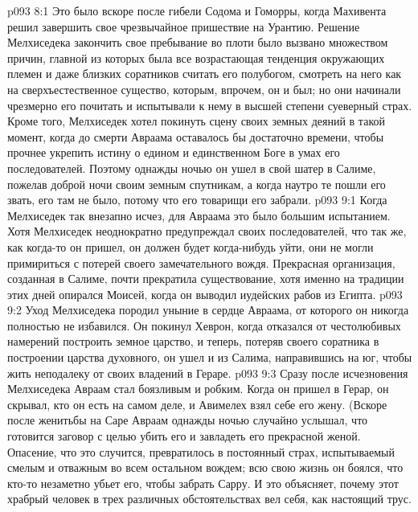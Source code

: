 \vs p093 8:1 Это было вскоре после гибели Содома и Гоморры, когда Махивента решил завершить свое чрезвычайное пришествие на Урантию. Решение Мелхиседека закончить свое пребывание во плоти было вызвано множеством причин, главной из которых была все возрастающая тенденция окружающих племен и даже близких соратников считать его полубогом, смотреть на него как на сверхъестественное существо, которым, впрочем, он и был; но они начинали чрезмерно его почитать и испытывали к нему в высшей степени суеверный страх. Кроме того, Мелхиседек хотел покинуть сцену своих земных деяний в такой момент, когда до смерти Авраама оставалось бы достаточно времени, чтобы прочнее укрепить истину о едином и единственном Боге в умах его последователей. Поэтому однажды ночью он ушел в свой шатер в Салиме, пожелав доброй ночи своим земным спутникам, а когда наутро те пошли его звать, его там не было, потому что его товарищи его забрали.
\vs p093 9:1 Когда Мелхиседек так внезапно исчез, для Авраама это было большим испытанием. Хотя Мелхиседек неоднократно предупреждал своих последователей, что так же, как когда\hyp{}то он пришел, он должен будет когда\hyp{}нибудь уйти, они не могли примириться с потерей своего замечательного вождя. Прекрасная организация, созданная в Салиме, почти прекратила существование, хотя именно на традиции этих дней опирался Моисей, когда он выводил иудейских рабов из Египта.
\vs p093 9:2 \pc Уход Мелхиседека породил уныние в сердце Авраама, от которого он никогда полностью не избавился. Он покинул Хеврон, когда отказался от честолюбивых намерений построить земное царство, и теперь, потеряв своего соратника в построении царства духовного, он ушел и из Салима, направившись на юг, чтобы жить неподалеку от своих владений в Гераре.
\vs p093 9:3 Сразу после исчезновения Мелхиседека Авраам стал боязливым и робким. Когда он пришел в Герар, он скрывал, кто он есть на самом деле, и Авимелех взял себе его жену. (Вскоре после женитьбы на Саре Авраам однажды ночью случайно услышал, что готовится заговор с целью убить его и завладеть его прекрасной женой. Опасение, что это случится, превратилось в постоянный страх, испытываемый смелым и отважным во всем остальном вождем; всю свою жизнь он боялся, что кто\hyp{}то незаметно убьет его, чтобы забрать Сарру. И это объясняет, почему этот храбрый человек в трех различных обстоятельствах вел себя, как настоящий трус.
